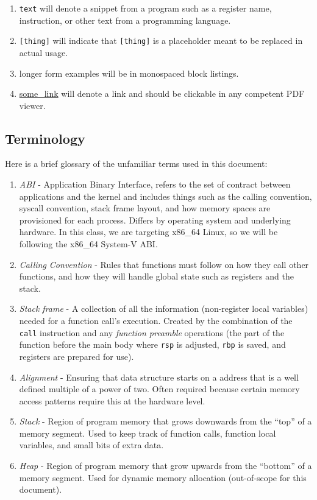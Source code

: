 \documentclass[11pt]{article}
\begin{document}
\begin{enumerate}
    \item \texttt{text} will denote a snippet from a program such as a register name,
        instruction, or other text from a programming language.
    \item \texttt{[thing]} will indicate that \texttt{[thing]} is a placeholder meant to
        be replaced in actual usage.
    \item longer form examples will be in monospaced block listings.
    \item \url{some_link} will denote a link and should be clickable in any competent PDF
        viewer.
\end{enumerate}

\subsection{Terminology}

Here is a brief glossary of the unfamiliar terms used in this document:

\begin{enumerate}
    \item \emph{ABI} - Application Binary Interface, refers to the set of contract between
        applications and the kernel and includes things such as the calling convention,
        syscall convention, stack frame layout, and how memory spaces are provisioned for
        each process. Differs by operating system and underlying hardware. In this class,
        we are targeting x86\_64 Linux, so we will be following the x86\_64 System-V ABI.
    \item \emph{Calling Convention} - Rules that functions must follow on how they call
        other functions, and how they will handle global state such as registers and the
        stack.
    \item \emph{Stack frame} - A collection of all the information (non-register local
        variables) needed for a function call's execution. Created by the combination of the
        \texttt{call} instruction and any \emph{function preamble} operations (the part of the
        function before the main body where \texttt{rsp} is adjusted, \texttt{rbp} is
        saved, and registers are prepared for use).
    \item \emph{Alignment} - Ensuring that data structure starts on a address that is a
        well defined multiple of a power of two. Often required because certain memory
        access patterns require this at the hardware level.
    \item \emph{Stack} - Region of program memory that grows downwards from the ``top'' of a
        memory segment. Used to keep track of function calls, function local variables,
        and small bits of extra data.
    \item \emph{Heap} - Region of program memory that grow upwards from  the ``bottom'' of
        a memory segment. Used for dynamic memory allocation (out-of-scope for this
        document).
\end{enumerate}
\end{document}
